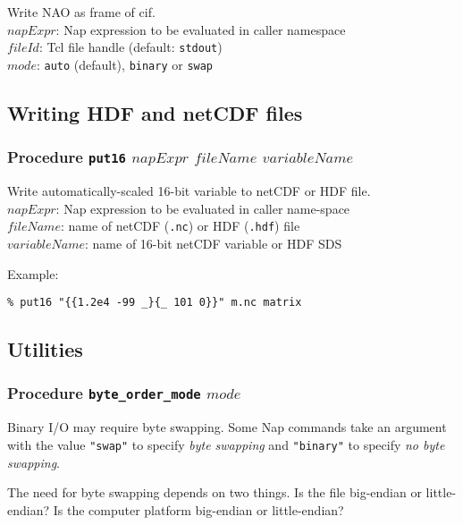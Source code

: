   Write NAO as frame of cif.
  \\
  $napExpr$: Nap expression to be evaluated in caller
  namespace
  \\
  $\mathit{fileId}$: Tcl file handle (default: 
  \texttt{stdout})
  \\
  $\mathit{mode}$: 
  \texttt{auto} (default), 
  \texttt{binary} or 
  \texttt{swap}

\subsection{Writing HDF and netCDF files}
    \label{bin-io-hdf-netcdf}

\subsubsection{Procedure \texttt{put16} $\mathit{napExpr}$
$\mathit{fileName}$ $\mathit{variableName}$}
    \label{bin-io-put16}

  Write automatically-scaled 16-bit variable to netCDF or HDF
  file.
  \\
  $napExpr$: Nap expression to be evaluated in caller
  name-space
  \\
  $\mathit{fileName}$: name of netCDF (\texttt{.nc}) or HDF (\texttt{.hdf}) file
  \\
  $\mathit{variableName}$: name of 16-bit netCDF variable or HDF SDS
  

Example:
  \begin{verbatim}
% put16 "{{1.2e4 -99 _}{_ 101 0}}" m.nc matrix
\end{verbatim}

\subsection{Utilities}
    \label{bin-io-Utilities}

\subsubsection{Procedure \texttt{byte\_order\_mode} $\mathit{mode}$}
    \label{bin-io-byte-order-mode}

Binary I/O may require byte swapping.
Some Nap commands take an argument with the value \texttt{"swap"} to specify \emph{byte swapping}
and \texttt{"binary"} to specify \emph{no byte swapping}.

The need for byte swapping depends on two things.
Is the file big-endian or little-endian?
Is the computer platform big-endian or little-endian?


